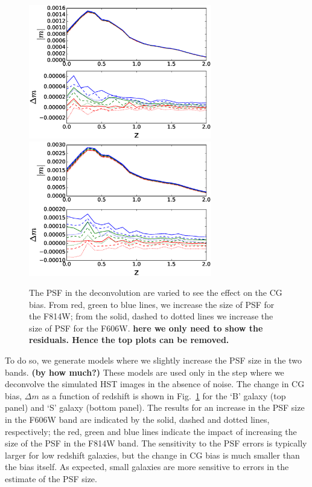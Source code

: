 \documentclass[useAMS,usenatbib]{mnras}
\begin{document}
\begin{figure}
\includegraphics[width=8.0cm]{varpsfB.eps}
\includegraphics[width=8.0cm]{varpsfS.eps}
\caption{The PSF in the deconvolution are varied to see the effect on
  the CG bias.  From red, green to blue lines, we increase the size of
  PSF for the F814W; from the solid, dashed to dotted lines we
  increase the size of PSF for the F606W.  {\bf here we only need to show
  the residuals. Hence the top plots can be removed.}}
\label{fig:psfacc1}
\end{figure}

To do so, we generate models where we slightly increase the PSF size in the two bands. {\bf (by how much?)} 
These models are used only in the step where we deconvolve the simulated HST images in the absence
of noise. The change in CG bias, $\Delta m$ as a function of redshift is shown in Fig.~\ref{fig:psfacc1}
for the `B' galaxy (top panel) and `S' galaxy (bottom panel).  The results for an increase in the PSF size in 
the F606W band are indicated by the solid, dashed and dotted lines, respectively; the red, green and blue 
lines indicate the impact of increasing the size of the PSF in the F814W band. The sensitivity to the PSF
errors is typically larger for low redshift galaxies, but the change in CG bias is much smaller than the bias
itself.  As expected, small galaxies are more sensitive to errors in the estimate of the PSF size.
\end{document}
